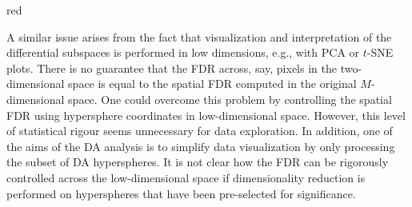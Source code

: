 \documentclass{article}
\begin{document}
\begin{color}{red}

A similar issue arises from the fact that visualization and interpretation of the differential subspaces is performed in low dimensions, e.g., with PCA or $t$-SNE plots.
There is no guarantee that the FDR across, say, pixels in the two-dimensional space is equal to the spatial FDR computed in the original $M$-dimensional space.
One could overcome this problem by controlling the spatial FDR using hypersphere coordinates in low-dimensional space.
However, this level of statistical rigour seems unnecessary for data exploration.
In addition, one of the aims of the DA analysis is to simplify data visualization by only processing the subset of DA hyperspheres.
It is not clear how the FDR can be rigorously controlled across the low-dimensional space if dimensionality reduction is performed on hyperspheres that have been pre-selected for significance.


\end{color}
\end{document}
